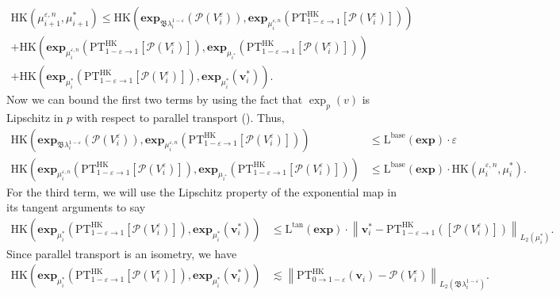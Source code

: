 \documentclass[11pt]{article}
\begin{document}
\begin{multline*}
    \text{HK}(\mu_{i+1}^{\varepsilon, n}, \mu_{i + 1}^*) \leq \text{HK}(\mathbf{exp}_{\mathfrak{B}\lambda_i^{1 - \varepsilon}}(\mathcal{P}(V_i^\varepsilon)), \mathbf{exp}_{\mu_{i}^{\varepsilon, n}}(\text{PT}^{\text{HK}}_{1 - \varepsilon \rightarrow 1}[\mathcal{P}(V_i^\varepsilon)]))\\ + \text{HK}(\mathbf{exp}_{\mu_{i}^{\varepsilon, n}}(\text{PT}^{\text{HK}}_{1 - \varepsilon \rightarrow 1}[\mathcal{P}(V_i^\varepsilon)]), \mathbf{exp}_{\mu_{i^*}}(\text{PT}^{\text{HK}}_{1 - \varepsilon \rightarrow 1}[\mathcal{P}(V_i^\varepsilon)])) \\+ \text{HK}(\mathbf{exp}_{\mu_i^*}(\text{PT}^{\text{HK}}_{1 - \varepsilon \rightarrow 1}[\mathcal{P}(V_i^\varepsilon)]), \mathbf{exp}_{\mu_i^*}(\mathbf{v}_i^{*})).
\end{multline*}
Now we can bound the first two terms by using the fact that $\exp_p(v)$ is Lipschitz in $p$ with respect to parallel transport (). Thus,
\begin{align*}
    \text{HK}(\mathbf{exp}_{\mathfrak{B}\lambda_i^{1 - \varepsilon}}(\mathcal{P}(V_i^\varepsilon)), \mathbf{exp}_{\mu_{i}^{\varepsilon, n}}(\text{PT}^{\text{HK}}_{1 - \varepsilon \rightarrow 1}[\mathcal{P}(V_i^\varepsilon)])) &\leq \text{L}^{\text{base}}(\mathbf{exp})\cdot \varepsilon \\
    \text{HK}(\mathbf{exp}_{\mu_{i}^{\varepsilon, n}}(\text{PT}^{\text{HK}}_{1 - \varepsilon \rightarrow 1}[\mathcal{P}(V_i^\varepsilon)]), \mathbf{exp}_{\mu_{i^*}}(\text{PT}^{\text{HK}}_{1 - \varepsilon \rightarrow 1}[\mathcal{P}(V_i^\varepsilon)])) &\leq \text{L}^{\text{base}}(\mathbf{exp})\cdot \text{HK}(\mu_{i}^{\varepsilon, n}, \mu_i^*).
\end{align*}
For the third term, we will use the Lipschitz property of the exponential map in its tangent arguments to say 
\begin{align*}
    \text{HK}(\mathbf{exp}_{\mu_i^*}(\text{PT}^{\text{HK}}_{1 - \varepsilon \rightarrow 1}[\mathcal{P}(V_i^\varepsilon)]), \mathbf{exp}_{\mu_i^*}(\mathbf{v}_i^{*})) &\leq \text{L}^{\text{tan}}(\mathbf{exp})\cdot \left\|\mathbf{v}_i^* - \text{PT}^{\text{HK}}_{1 - \varepsilon \rightarrow 1}([\mathcal{P}(V_i^\varepsilon)]) \right\|_{L_2(\mu_i^*)}.
\end{align*}
Since parallel transport is an isometry, we have 
\begin{align*}
    \text{HK}(\mathbf{exp}_{\mu_i^*}(\text{PT}^{\text{HK}}_{1 - \varepsilon \rightarrow 1}[\mathcal{P}(V_i^\varepsilon)]), \mathbf{exp}_{\mu_i^*}(\mathbf{v}_i^{*})) &\lesssim  \left\|\text{PT}^{\text{HK}}_{0 \rightarrow 1 - \varepsilon}(\mathbf{v}_i) - \mathcal{P}(V_i^\varepsilon) \right\|_{L_2(\mathfrak{B}\lambda_i^{1- \varepsilon})}.
\end{align*}
\end{document}
